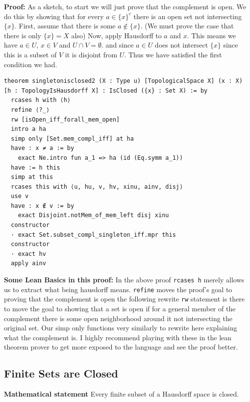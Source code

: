 \documentclass[11pt]{article}
\begin{document}

\textbf{Proof:} As a sketch, to start we will just prove that the complement is open. We do this by showing that for every $a \in \{x\}^c$ there is an open set not intersecting $\{x\}$. First, assume that there is some $a \not \in \{x\}$. (We must prove the case that there is only $\{x\} = X$ also) Now, apply Hausdorff to $a$ and $x$. This means we have $a \in U$, $x \in V$ and $U \cap V = \emptyset$. and since $a \in U$ does not intersect $\{x\}$ since this is a subset of $V$ it is disjoint from $U$. Thus we have satisfied the first condition we had. 

\begin{verbatim}
theorem singletonisclosed2 (X : Type u) [TopologicalSpace X] (x : X) [h : TopologyIsHausdorff X] : IsClosed ({x} : Set X) := by
  rcases h with ⟨h⟩
  refine ⟨?_⟩
  rw [isOpen_iff_forall_mem_open]
  intro a ha
  simp only [Set.mem_compl_iff] at ha 
  have : x ≠ a := by 
    exact Ne.intro fun a_1 => ha (id (Eq.symm a_1))
  have := h this
  simp at this
  rcases this with ⟨u, hu, v, hv, xinu, ainv, disj⟩ 
  use v 
  have : x ∉ v := by 
    exact Disjoint.notMem_of_mem_left disj xinu
  constructor
  · exact Set.subset_compl_singleton_iff.mpr this
  constructor
  · exact hv
  apply ainv
\end{verbatim}

\medskip
\noindent
\textbf{Some Lean Basics in this proof:} In the above proof \verb|rcases h| merely allows us to extract what being hausdorff means. \verb|refine| moves the proof's goal to proving that the complement is open the following rewrite \verb|rw| statement is there to move the goal to showing that a set is open if for a general member of the complement there is some open neighborhood around it not intersecting the original set. Our simp only functions very similarly to rewrite here explaining what the complement is. I highly recommend playing with these in the lean theorem prover to get more exposed to the language and see the proof better.  

\subsection{Finite Sets are Closed}

\textbf{Mathematical statement} 
Every finite subset of a Hausdorff space is closed.
\end{document}
